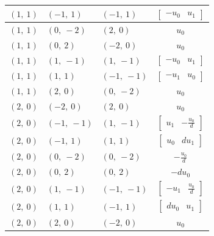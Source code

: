 \documentclass[11pt]{article}
\theoremstyle{definition}
\begin{document}
\begin{longtable}{|l|l|l|c|}
    \hline
    $\left( 1, \  1\right)$ & $\left( -1, \  1\right)$ & $\left( -1, \  1\right)$ & $\left[\begin{matrix}- u_{0} & u_{1}\end{matrix}\right]$ \\
    \hline
    $\left( 1, \  1\right)$ & $\left( 0, \  -2\right)$ & $\left( 2, \  0\right)$ & $u_{0}$ \\
    \hline
    $\left( 1, \  1\right)$ & $\left( 0, \  2\right)$ & $\left( -2, \  0\right)$ & $u_{0}$ \\
    \hline
    $\left( 1, \  1\right)$ & $\left( 1, \  -1\right)$ & $\left( 1, \  -1\right)$ & $\left[\begin{matrix}- u_{0} & u_{1}\end{matrix}\right]$ \\
    \hline
    $\left( 1, \  1\right)$ & $\left( 1, \  1\right)$ & $\left( -1, \  -1\right)$ & $\left[\begin{matrix}- u_{1} & u_{0}\end{matrix}\right]$ \\
    \hline
    $\left( 1, \  1\right)$ & $\left( 2, \  0\right)$ & $\left( 0, \  -2\right)$ & $u_{0}$ \\
    \hline
    $\left( 2, \  0\right)$ & $\left( -2, \  0\right)$ & $\left( 2, \  0\right)$ & $u_{0}$ \\
    \hline
    $\left( 2, \  0\right)$ & $\left( -1, \  -1\right)$ & $\left( 1, \  -1\right)$ & $\left[\begin{matrix}u_{1} & - \frac{u_{0}}{d}\end{matrix}\right]$ \\
    \hline
    $\left( 2, \  0\right)$ & $\left( -1, \  1\right)$ & $\left( 1, \  1\right)$ & $\left[\begin{matrix}u_{0} & d u_{1}\end{matrix}\right]$ \\
    \hline
    $\left( 2, \  0\right)$ & $\left( 0, \  -2\right)$ & $\left( 0, \  -2\right)$ & $- \frac{u_{0}}{d}$ \\
    \hline
    $\left( 2, \  0\right)$ & $\left( 0, \  2\right)$ & $\left( 0, \  2\right)$ & $- d u_{0}$ \\
    \hline
    $\left( 2, \  0\right)$ & $\left( 1, \  -1\right)$ & $\left( -1, \  -1\right)$ & $\left[\begin{matrix}- u_{1} & \frac{u_{0}}{d}\end{matrix}\right]$ \\
    \hline
    $\left( 2, \  0\right)$ & $\left( 1, \  1\right)$ & $\left( -1, \  1\right)$ & $\left[\begin{matrix}d u_{0} & u_{1}\end{matrix}\right]$ \\
    \hline
    $\left( 2, \  0\right)$ & $\left( 2, \  0\right)$ & $\left( -2, \  0\right)$ & $u_{0}$ \\
    \hline
\end{longtable}
\end{document}
